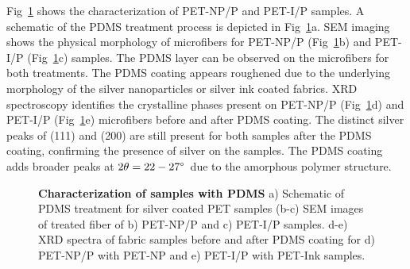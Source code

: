 \documentclass[10pt,letterpaper]{article}
\begin{document}
Fig~\ref{fig3} shows the characterization of PET-NP/P and PET-I/P samples. A schematic of the  PDMS treatment process is depicted in Fig~\ref{fig3}a.
SEM imaging shows the physical morphology of microfibers for PET-NP/P (Fig~\ref{fig3}b) and PET-I/P (Fig~\ref{fig3}c) samples. The PDMS layer can be observed on the microfibers for both treatments. The PDMS coating appears roughened due to the underlying morphology of the silver nanoparticles or silver ink coated fabrics.
XRD spectroscopy identifies the crystalline phases present on PET-NP/P (Fig~\ref{fig3}d) and PET-I/P (Fig~\ref{fig3}e) microfibers before and after PDMS coating. The distinct silver peaks of (111) and (200) are still present for both samples after the PDMS coating, confirming the presence of silver on the samples. The PDMS coating adds broader peaks at $2\theta = 22-27\degree$~due to the amorphous polymer structure. 

\begin{figure}[!h]
\caption{{\bf Characterization of samples with PDMS}{
a) Schematic of PDMS treatment for silver coated PET samples (b-c) SEM images of treated fiber of b) PET-NP/P and c) PET-I/P samples. d-e) XRD spectra of fabric samples before and after PDMS coating for d) PET-NP/P with PET-NP and e) PET-I/P with PET-Ink samples.}}
\label{fig3}
\end{figure}

\end{document}
